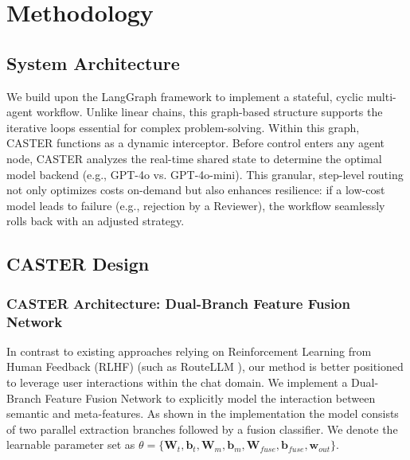 \documentclass{article}
\theoremstyle{plain}
\theoremstyle{definition}
\theoremstyle{remark}
\begin{document}
\section{Methodology}


\subsection{System Architecture} 
We build upon the LangGraph framework to implement a stateful, cyclic multi-agent workflow. Unlike linear chains, this graph-based structure supports the iterative loops essential for complex problem-solving. Within this graph, CASTER functions as a dynamic interceptor. Before control enters any agent node, CASTER analyzes the real-time shared state to determine the optimal model backend (e.g., GPT-4o vs. GPT-4o-mini). This granular, step-level routing not only optimizes costs on-demand but also enhances resilience: if a low-cost model leads to failure (e.g., rejection by a Reviewer), the workflow seamlessly rolls back with an adjusted strategy.

\subsection{CASTER Design}

\subsubsection{CASTER Architecture: Dual-Branch Feature Fusion Network}

In contrast to existing approaches relying on Reinforcement Learning from Human Feedback (RLHF) (such as RouteLLM \cite{ong2024routellm}), our method is better positioned to leverage user interactions within the chat domain. We implement a Dual-Branch Feature Fusion Network to explicitly model the interaction between semantic and meta-features. As shown in the implementation the model consists of two parallel extraction branches followed by a fusion classifier. We denote the learnable parameter set as $\theta = \{ \mathbf{W}_t, \mathbf{b}_t, \mathbf{W}_m, \mathbf{b}_m, \mathbf{W}_{fuse}, \mathbf{b}_{fuse}, \mathbf{w}_{out} \}$.
\end{document}
